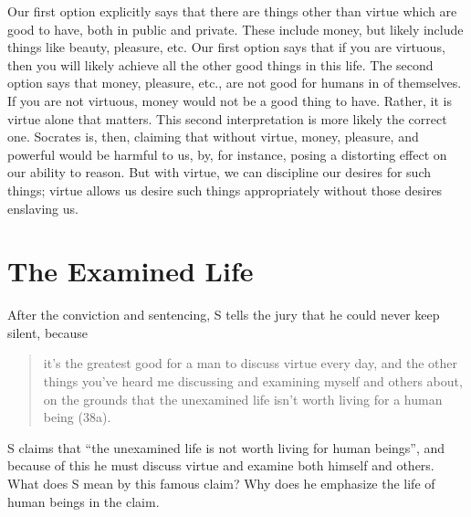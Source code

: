 \documentclass[oneside]{article}
\begin{document}
Our first option explicitly says that there are things other than virtue which are good to have, both in public and private. These include money, but likely include things like beauty, pleasure, etc. Our first option says that if you are virtuous, then you will likely achieve all the other good things in this life. The second option says that money, pleasure, etc., are not good for humans in of themselves. If you are not virtuous, money would not be a good thing to have. Rather, it is virtue alone that matters. This second interpretation is more likely the correct one. Socrates is, then, claiming that without virtue, money, pleasure, and powerful would be harmful to us, by, for instance, posing a distorting effect on our ability to reason. But with virtue, we can discipline our desires for such things; virtue allows us desire such things appropriately without those desires enslaving us. 

\section*{The Examined Life}

After the conviction and sentencing, S tells the jury that he could never keep silent, because
\begin{quote}
it’s the greatest good for a man to discuss virtue every day, and the other things you’ve heard me discussing and examining myself and others about, on the grounds that the unexamined life isn’t worth living for a human being (38a).
\end{quote}
S claims that ``the unexamined life is not worth living for human beings'', and because of this he must discuss virtue and examine both himself and others. What does S mean by this famous claim? Why does he emphasize the life of human beings in the claim. 


\end{document}
